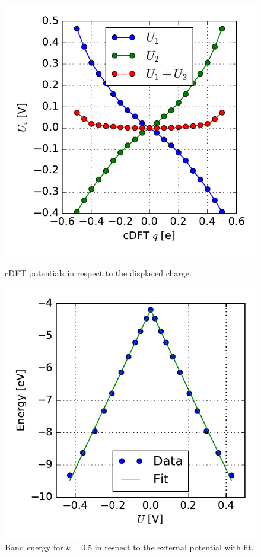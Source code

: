 \begin{figure}[!p]
\centering
\begin{minipage}{0.49\textwidth}
\centering
\includegraphics[width = \textwidth]{Images/Hydrogen/charging/potential_q_1}
\caption{cDFT potentials in respect to the displaced charge.\\}
\label{image_potentials_qs_1}	
\end{minipage}\hspace*{.5cm}
\begin{minipage}{0.49\textwidth}
\centering
\includegraphics[width = \textwidth]{Images/Hydrogen/charging/border_energy_q_1}
\caption{Band energy for $k = 0.5$ in respect to the external potential with fit.}
\label{image_edge_energy_qs_1}
\end{minipage}
\end{figure}
